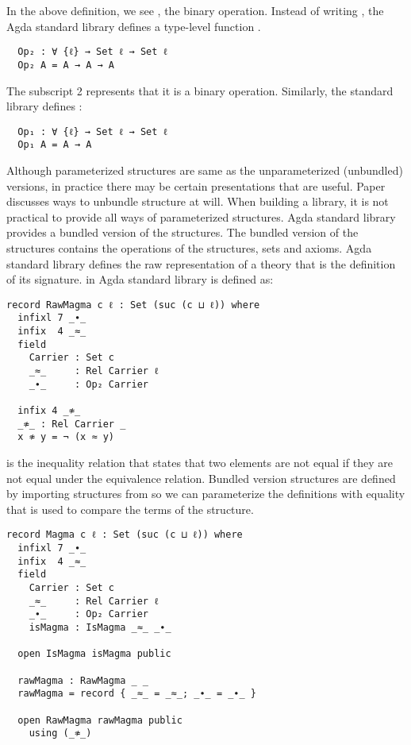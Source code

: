 In the above definition, we see , the binary operation.
Instead of writing , the Agda standard library defines a
type-level function .

\begin{verbatim}
  Op₂ : ∀ {ℓ} → Set ℓ → Set ℓ
  Op₂ A = A → A → A
\end{verbatim}

The subscript 2 represents that it is a binary operation. Similarly, the
standard library defines :

\begin{verbatim}
  Op₁ : ∀ {ℓ} → Set ℓ → Set ℓ
  Op₁ A = A → A
\end{verbatim}

Although parameterized structures are same as the unparameterized (unbundled)
versions, in practice there may be certain presentations that are useful. Paper
\cite{al2019language} discusses ways to unbundle structure at will. When building
a library, it is not practical to provide all ways of parameterized structures.
Agda standard library provides a bundled version of the structures. The bundled
version of the structures contains the operations of the structures, sets and
axioms. Agda standard library defines the raw representation of a theory that is
the definition of its signature.  in Agda standard library is defined as:

\begin{verbatim}
record RawMagma c ℓ : Set (suc (c ⊔ ℓ)) where
  infixl 7 _∙_
  infix  4 _≈_
  field
    Carrier : Set c
    _≈_     : Rel Carrier ℓ
    _∙_     : Op₂ Carrier

  infix 4 _≉_
  _≉_ : Rel Carrier _
  x ≉ y = ¬ (x ≈ y)
\end{verbatim}

 is the inequality relation that states that two elements are not
equal  if they are not equal under the equivalence relation.
Bundled version structures are defined by importing structures from
 so we can parameterize the definitions with equality that
is used to compare the terms of the structure.

\begin{verbatim}
record Magma c ℓ : Set (suc (c ⊔ ℓ)) where
  infixl 7 _∙_
  infix  4 _≈_
  field
    Carrier : Set c
    _≈_     : Rel Carrier ℓ
    _∙_     : Op₂ Carrier
    isMagma : IsMagma _≈_ _∙_

  open IsMagma isMagma public

  rawMagma : RawMagma _ _
  rawMagma = record { _≈_ = _≈_; _∙_ = _∙_ }

  open RawMagma rawMagma public
    using (_≉_)
\end{verbatim}

